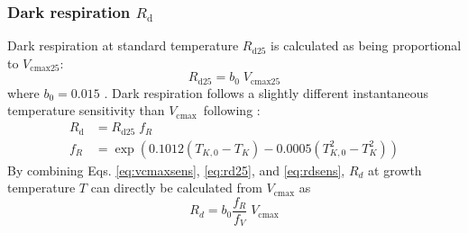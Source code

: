 \documentclass{myreport}
\newcommand{\vcmax}{$V_{\text{cmax}}$}
\begin{document}
\subsubsection{Dark respiration $R_{\mathrm{d}}$}
\label{sec:rd}
Dark respiration at standard temperature $R_{\mathrm{d25}}$ is calculated as being proportional to $V_{\mathrm{cmax25}}$:
\begin{equation}
\label{eq:rd25}
    R_{\mathrm{d25}} = b_0 \; V_{\mathrm{cmax25}}
\end{equation}
where $b_0 = 0.015$ \citep{atkin15}. Dark respiration follows a slightly different instantaneous temperature sensitivity than \vcmax\ following \citet{heskel16}:
\begin{align}
\label{eq:rdsens}
    R_{\mathrm{d}} &=  R_{\mathrm{d25}}\; f_R  \\
    f_R &= \exp \left(  0.1012(T_{K,0}-T_K) - 0.0005(T_{K,0}^2-T_K^2) \right) 
\end{align}
By combining Eqs. \ref{eq:vcmaxsens}, \ref{eq:rd25}, and \ref{eq:rdsens}, $R_d$ at growth temperature $T$ can directly be calculated from $V_{\mathrm{cmax}}$ as
\begin{equation}
\label{eq:rd}
    R_d = b_0 \frac{f_R}{f_V}\;V_{\mathrm{cmax}}
\end{equation}
\end{document}
